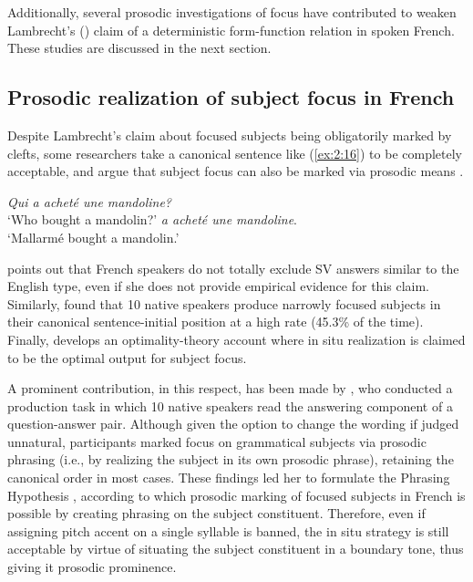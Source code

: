 Additionally, several prosodic investigations of focus have contributed to wea\-ken Lambrecht’s (\citeyear{lambrecht1996information}) claim  of a deterministic form-function relation in spoken French. These studies are discussed in the next section.

 \subsection{Prosodic realization of subject focus in French} \label{sub:3.3.2}
Despite Lambrecht’s
claim about focused subjects being obligatorily marked by clefts, some researchers take a canonical sentence like (\ref{ex:2:16}) to be completely acceptable, and argue that subject focus can also be marked via prosodic means \parencite{beyssade2004prosody}.

 \ea \label{ex:2:16}
\ea  \textit{Qui a acheté une mandoline?}\\
 `Who bought a mandolin?'
 \normalsize \textit{a acheté une mandoline}.\\
`Mallarmé bought a mandolin.' \hfill \parencite[478]{beyssade2004prosody}   
\z \z 


\textcite{belletti2010structures} points out that French speakers do not totally exclude SV answers similar to the English type, even if she does not provide empirical evidence for this claim. Similarly, \textcite{skopeteas2010focus}  found that 10 native speakers produce narrowly focused subjects in  their canonical sentence-initial position at a high rate (45.3\% of the time). Finally, \textcite{samek2005prosody} develops an optimality-theory account where in situ realization is claimed to be the optimal output for subject focus. 

A prominent contribution, in this respect, has been made by \textcite{fery2001focus}, who conducted a production task in which 10 native speakers read the answering component of a question-answer pair. Although given the option to change the wording if judged unnatural, participants marked focus on grammatical subjects via prosodic phrasing (i.e., by realizing the subject in its own prosodic phrase), retaining the canonical order in most cases. These findings led her to formulate the Phrasing Hypothesis \parencite{fery2001focus}, according to which prosodic marking of focused subjects in French is possible by creating phrasing on the subject constituent. Therefore, even if assigning pitch accent on a single syllable is banned, the in situ strategy is still acceptable by virtue of situating the subject constituent in a boundary tone, thus giving it prosodic prominence. 

